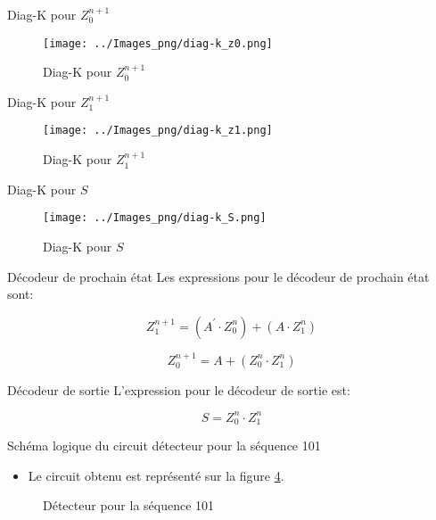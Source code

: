 \documentclass[presentation]{beamer}
\begin{document}
\begin{frame}[label={sec:orgf3726bc}]{Diag-K pour \(Z_0^{n+1}\)}
\begin{figure}[htbp]
\centering
\texttt{[image: ../Images\_png/diag-k\_z0.png]}
\caption{\label{fig:orged1a782}Diag-K pour \(Z_0^{n+1}\)}
\end{figure}
\end{frame}

\begin{frame}[label={sec:org0121453}]{Diag-K pour \(Z_1^{n+1}\)}
\begin{figure}[htbp]
\centering
\texttt{[image: ../Images\_png/diag-k\_z1.png]}
\caption{\label{fig:orgf0a4fce}Diag-K pour \(Z_1^{n+1}\)}
\end{figure}
\end{frame}

\begin{frame}[label={sec:org134462b}]{Diag-K pour \(S\)}
\begin{figure}[htbp]
\centering
\texttt{[image: ../Images\_png/diag-k\_S.png]}
\caption{\label{fig:org98b896d}Diag-K pour \(S\)}
\end{figure}
\end{frame}

\begin{frame}[label={sec:org0e9e615}]{Décodeur de prochain état}
Les expressions pour le décodeur de prochain état sont:

$$ Z_1^{n+1} = (A^\prime \cdot Z_0^{n}) + (A \cdot  Z_1^{n}) $$

$$ Z_0^{n+1} = A + (Z_0^{n} \cdot Z_1^{n}) $$
\end{frame}

\begin{frame}[label={sec:orgb351698}]{Décodeur de sortie}
L'expression pour le décodeur de sortie est:

$$ S = Z_0^{n} \cdot Z_1^{n} $$
\end{frame}

\begin{frame}[label={sec:org53027fd}]{Schéma logique du circuit détecteur pour la séquence 101}
\begin{itemize}
\item Le circuit obtenu est représenté sur la figure \ref{fig:org21aadfb}.
\end{itemize}

\begin{figure}[htbp]
\centering

\caption{\label{fig:org21aadfb}Détecteur pour la séquence 101}
\end{figure}
\end{frame}
\end{document}
